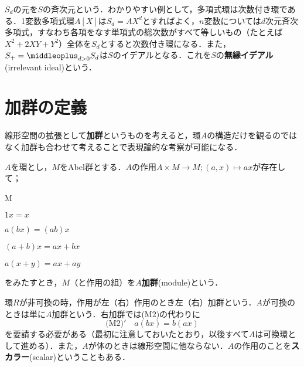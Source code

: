 $S_d$の元を$S$の斉次元という．わかりやすい例として，多項式環は次数付き環である．1変数多項式環$A[X]$は$S_d=AX^d$とすればよく，$n$変数については$d$次元斉次多項式，すなわち各項をなす単項式の総次数がすべて等しいもの（たとえば$X^2+2XY+Y^2$）全体を$S_d$とすると次数付き環になる．また，$S_+=\middleoplus_{d>0}S_d$は$S$のイデアルとなる．これを$S$の\textbf{無縁イデアル}(irrelevant ideal)という．


\section{加群の定義}

線形空間の拡張として\textbf{加群}というものを考えると，環$A$の構造だけを観るのではなく加群も合わせて考えることで表現論的な考察が可能になる．

\begin{defi}[加群]
	$A$を環とし，$M$をAbel群とする．$A$の作用$A\times M\to M;(a,x)\mapsto ax$が存在して；
	\begin{defiterm}{M}
		\item $1x=x$
		\item $a(bx)=(ab)x$
		\item $(a+b)x=ax+bx$
		\item $a(x+y)=ax+ay$
	\end{defiterm}
	をみたすとき，$M$（と作用の組）を$A$\textbf{加群}(module)という．
\end{defi}

環$R$が非可換の時，作用が左（右）作用のとき左（右）加群という．$A$が可換のときは単に$A$加群という．右加群では(M2)の代わりに
\[\textrm{(M2)}'\quad a(bx)=b(ax)\]
を要請する必要がある（最初に注意しておいたとおり，以後すべて$A$は可換環として進める）．また，$A$が体のときは線形空間に他ならない．$A$の作用のことを\textbf{スカラー}(scalar)ということもある．

